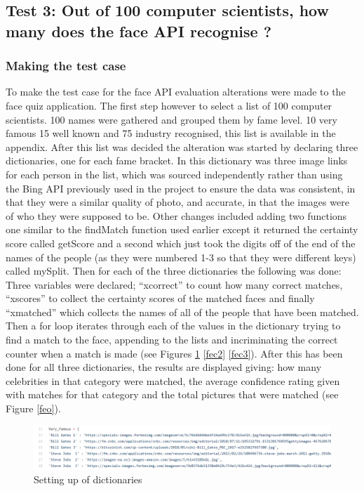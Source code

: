 \documentclass[12pt,a4paper]{article}
\begin{document}
\subsection{Test 3: Out of 100 computer scientists, how many does the face API recognise ?}  

\subsubsection{Making the test case}

To make the test case for the face API evaluation alterations were made to the face quiz application. The first step however to select a list of 100 computer scientists. 100 names were gathered and grouped them by fame level. 10 very famous 15 well known and 75 industry recognised, this list is available in the appendix. After this list was decided the alteration was started by declaring three dictionaries, one for each fame bracket. In this dictionary was three image links for each person in the list, which was sourced independently rather than using the Bing API previously used in the project to ensure the data was consistent, in that they were a similar quality of photo, and accurate, in that the images were of who they were supposed to be. Other changes included adding two functions one similar to the findMatch function used earlier except it returned the certainty score called getScore and a second which just took the digits off of the end of the names of the people (as they were numbered 1-3 so that they were different keys) called mySplit. Then for each of the three dictionaries the following was done: Three variables were declared; “xcorrect” to count how many correct matches, “xscores” to collect the certainty scores of the matched faces and finally “xmatched” which collects the names of all of the people that have been matched. Then a for loop iterates through each of the values in the dictionary trying to find a match to the face, appending to the lists and incriminating the correct counter when a match is made  (see Figures \ref{fec1} \ref{fec2} \ref{fec3}).  After this has been done for all three dictionaries, the results are displayed giving: how many celebrities in that category were matched, the average confidence rating given with matches for that category and the total pictures that were matched (see Figure \ref{feo}).    

\begin{figure}[!ht]
    \centering
    \includegraphics[width=1.0\textwidth]{Figs/faceevalcode1.PNG} 
    \caption{Setting up of dictionaries} 
    \label{fec1}
\end{figure} 
\end{document}

